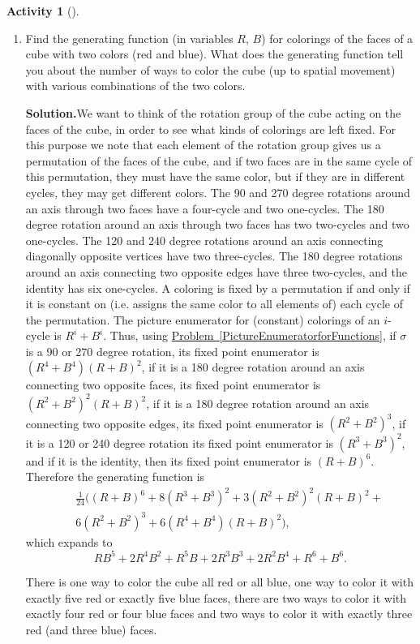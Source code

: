 \documentclass[10pt,]{book}
\theoremstyle{plain}
\theoremstyle{definition}
\newtheorem{activity}[project]{Activity}
\numberwithin{equation}{chapter}
\newcommand{\amp}{&}
\begin{document}
\begin{activity}[]
\begin{enumerate}[label=(\alph*)]
~\par
\item Find the generating function (in variables \(R\), \(B\)) for colorings of the faces of a cube with two colors (red and blue). What does the generating function tell you about the number of ways to color the cube (up to spatial movement) with various combinations of the two colors.%
\par\medskip\noindent%
\textbf{Solution.}\quad We want to think of the rotation group of the cube acting on the faces of the cube, in order to see what kinds of colorings are left fixed. For this purpose we note that each element of the rotation group gives us a permutation of the faces of the cube, and if two faces are in the same cycle of this permutation, they must have the same color, but if they are in different cycles, they may get different colors. The 90 and 270 degree rotations around an axis through two faces have a four-cycle and two one-cycles. The 180 degree rotation around an axis through two faces has two two-cycles and two one-cycles. The 120 and 240 degree rotations around an axis connecting diagonally opposite vertices have two three-cycles. The 180 degree rotations around an axis connecting two opposite edges have three two-cycles, and the identity has six one-cycles. A coloring is fixed by a permutation if and only if it is constant on (i.e. assigns the same color to all elements of) each cycle of the permutation. The picture enumerator for (constant) colorings of an \(i\)-cycle is \(R^i+B^i\). Thus, using \hyperref[PictureEnumeratorforFunctions]{Problem~\ref{PictureEnumeratorforFunctions}}, if \(\sigma\) is a 90 or 270 degree rotation, its fixed point enumerator is \((R^4+B^4)(R+B)^2\), if it is a 180 degree rotation around an axis connecting two opposite faces, its fixed point enumerator is \((R^2+B^2)^2(R+B)^2\), if it is a 180 degree rotation around an axis connecting two opposite edges, its fixed point enumerator is \((R^2+B^2)^3\), if it is a 120 or 240 degree rotation its fixed point enumerator is \((R^3+B^3)^2\), and if it is the identity, then its fixed point enumerator is \((R+B)^6\). Therefore the generating function is%
\begin{align*}
\amp \amp \frac{1}{24}\big((R+B)^6 + 8(R^3+B^3)^2 + 3(R^2+B^2)^2(R+B)^2 +\\
\amp \amp 6
(R^2+B^2)^3 + 6 (R^4+B^4)(R+B)^2\big),
\end{align*}
which expands to%
\begin{equation*}
RB^5+2R^4B^2+R^5B+2R^3B^3+2R^2B^4+R^6+B^6.
\end{equation*}
%
\par
There is one way to color the cube all red or all blue, one way to color it with exactly five red or exactly five blue faces, there are two ways to color it with exactly four red or four blue faces and two ways to color it with exactly three red (and three blue) faces.%

\end{enumerate}
\end{activity}
\typeout{************************************************}
\typeout{************************************************}
\end{document}
